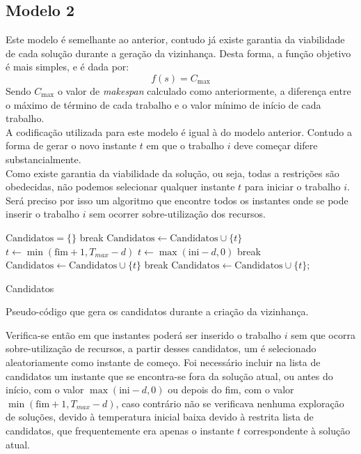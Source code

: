 \subsection{Modelo 2}

Este modelo é semelhante ao anterior, contudo já existe garantia da viabilidade de cada solução durante a geração da vizinhança. Desta forma, a função objetivo é mais simples, e é dada por:\\
$$f(s) = C_{\max}$$
Sendo $C_{\max}$ o valor de \textit{makespan} calculado como anteriormente, a diferença entre o máximo de término de cada trabalho e o valor mínimo de início de cada trabalho.\\

A codificação utilizada para este modelo é igual à do modelo anterior. Contudo a forma de gerar o novo instante $t$ em que o trabalho $i$ deve começar difere substancialmente.\\
Como existe garantia da viabilidade da solução, ou seja, todas a restrições são obedecidas, não podemos selecionar qualquer instante $t$ para iniciar o trabalho $i$. Será preciso por isso um algoritmo que encontre todos os instantes onde se pode inserir o trabalho $i$ sem ocorrer sobre-utilização dos recursos.\\
\begin{algorithm}[H]
	$\text{Candidatos}=\{\}$\;
	{
    	{
			{
				{
					break 
				}
			}
    	}
    	$\text{Candidatos} \gets \text{Candidatos} \cup \{t\}$ 
	}
	$t \gets \min(\text{fim}+1, T_{max}-d)$\;
    {
		{
			{
				$t \gets \max(\text{ini}-d, 0)$\;
    			{
					{
						{
							break\;
						}
					}
    			}
    			$\text{Candidatos} \gets \text{Candidatos} \cup \{t\}$\;
				break\;
			}
		}
    }
    $\text{Candidatos} \gets \text{Candidatos} \cup \{t\}$;\

	\Return Candidatos
    \caption{Pseudo-código que gera os candidatos durante a criação da vizinhança.}
\end{algorithm}
Verifica-se então em que instantes poderá ser inserido o trabalho $i$ sem que ocorra sobre-utilização de recursos, a partir desses candidatos, um é selecionado aleatoriamente como instante de começo. Foi necessário incluir na lista de candidatos um instante que se encontra-se fora da solução atual, ou antes do início, com o valor $\max(\text{ini}-d, 0)$ ou depois do fim, com o valor $\min(\text{fim}+1, T_{max}-d)$, caso contrário não se verificava nenhuma exploração de soluções, devido à temperatura inicial baixa devido à restrita lista de candidatos, que frequentemente era apenas o instante $t$ correspondente à solução atual.\\
